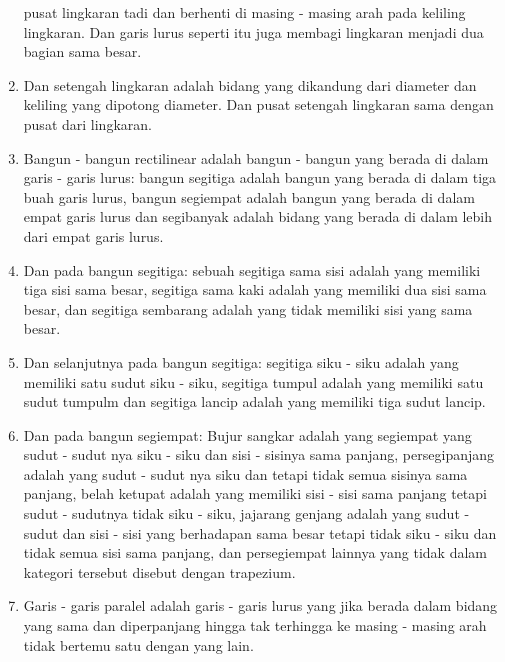 \documentclass[a4paper, 12pt]{book}
\begin{document}
\begin{enumerate}
pusat lingkaran tadi dan berhenti di masing - masing arah pada
keliling lingkaran. Dan garis lurus seperti itu juga membagi lingkaran 
menjadi dua bagian sama besar.
\item Dan setengah lingkaran adalah bidang yang dikandung dari diameter dan 
keliling yang dipotong diameter. Dan pusat setengah lingkaran sama dengan 
pusat dari lingkaran.
\item Bangun - bangun rectilinear adalah bangun - bangun yang berada di dalam
garis - garis lurus: bangun segitiga adalah bangun yang berada di dalam tiga buah
garis lurus, bangun segiempat adalah bangun yang berada di dalam empat garis lurus dan 
segibanyak adalah bidang yang berada di dalam lebih dari empat garis lurus.
\item Dan pada bangun segitiga: sebuah segitiga sama sisi adalah yang memiliki tiga
sisi sama besar, segitiga sama kaki adalah yang memiliki dua sisi sama besar, dan 
segitiga sembarang adalah yang tidak memiliki sisi yang sama besar.
\item Dan selanjutnya pada bangun segitiga: segitiga siku - siku adalah yang memiliki
satu sudut siku - siku, segitiga tumpul adalah yang memiliki satu sudut tumpulm dan 
segitiga lancip adalah yang memiliki tiga sudut lancip.
\item Dan pada bangun segiempat: Bujur sangkar adalah yang segiempat yang
sudut - sudut nya siku - siku dan sisi - sisinya sama panjang, persegipanjang
adalah yang sudut - sudut nya siku dan tetapi tidak semua sisinya sama panjang, 
belah ketupat adalah yang memiliki sisi - sisi sama panjang tetapi
sudut - sudutnya tidak siku - siku, jajarang genjang adalah yang sudut - sudut 
dan sisi - sisi yang berhadapan sama besar tetapi tidak siku - siku dan tidak 
semua sisi sama panjang, dan persegiempat lainnya yang tidak dalam kategori tersebut
disebut dengan trapezium.
\item Garis - garis paralel adalah garis - garis lurus yang jika berada dalam 
bidang yang sama dan diperpanjang hingga tak terhingga ke masing - masing arah
tidak bertemu satu dengan yang lain.  
\end{enumerate}
\end{document}
